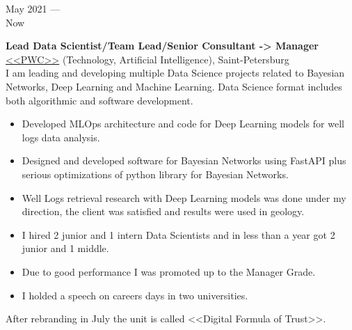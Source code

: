 \documentclass[10pt,a4paper]{article}
\newcommand{\lmpratio}{0.15}
\newcommand{\rmpratio}{0.74}
\newcommand{\vSpace}{0.5cm}
\newcommand{\horizontalSpace}{0.05\textwidth}
\newcommand{\sectionMain}[1]{\textbf{#1}}
\begin{document}
	\begin{minipage}[t]{\lmpratio\textwidth}
		May 2021 --- \\Now
	\end{minipage}
	\hspace{\horizontalSpace}
	\begin{minipage}[t]{\rmpratio\textwidth}
		\sectionMain{Lead Data Scientist/Team Lead/Senior Consultant -> Manager}\\
		\href{https://www.pwc.ru/}{<<PWC>>} (Technology, Artificial Intelligence), Saint-Petersburg\\[0.1cm]		

I am leading and developing multiple Data Science projects related to Bayesian Networks, Deep Learning and Machine Learning.
Data Science format includes both algorithmic and software development.

		\begin{itemize}
                \item 
Developed MLOps architecture and code for Deep Learning models for well logs data analysis.
			\item 
Designed and developed software for Bayesian Networks using FastAPI plus serious optimizations of python library for Bayesian Networks.
			\item 
Well Logs retrieval research with Deep Learning models was done under my direction, the client was satisfied and results were used in geology.
                \item 
I hired 2 junior and 1 intern Data Scientists and in less than a year got 2 junior and 1 middle.
                \item 
Due to good performance I was promoted up to the Manager Grade.
                \item 
I holded a speech on careers days in two universities.
		\end{itemize}
		
After rebranding in July the unit is called <<Digital Formula of Trust>>.
		
	\end{minipage}	
	\vspace{\vSpace}
	
\end{document}
